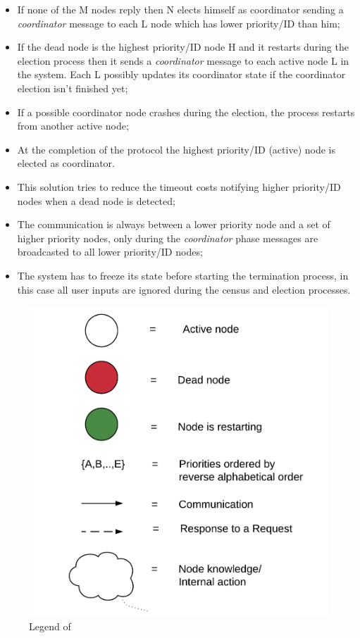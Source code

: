 \begin{itemize}
  \item If none of the M nodes reply then N elects himself as coordinator sending a \textit{coordinator} message to each L node which has lower priority/ID than him;
  \item If the dead node is the highest priority/ID node H and it restarts during the election process then it sends a \textit{coordinator} message to each active node L in the system. Each L possibly updates its coordinator state if the coordinator election isn't finished yet;
  \item If a possible coordinator node crashes during the election, the process restarts from another active node;
  \item At the completion of the protocol the highest priority/ID (active) node is elected as coordinator.
  \item This solution tries to reduce the timeout costs notifying higher priority/ID nodes when a dead node is detected;
  \item The communication is always between a lower priority node and a set of higher priority nodes, only during the \textit{coordinator} phase messages are broadcasted to all lower priority/ID nodes;
  \item The system has to freeze its state before starting the termination process, in this case all user inputs are ignored during the census and election processes.
\end{itemize}


\begin{figure}[H]
  \centering
  \includegraphics[width=0.6\columnwidth]{sections/images/solution/election_legend.pdf}
  \caption{Legend of }
  \label{fig:election-protocol-legend}
\end{figure}

